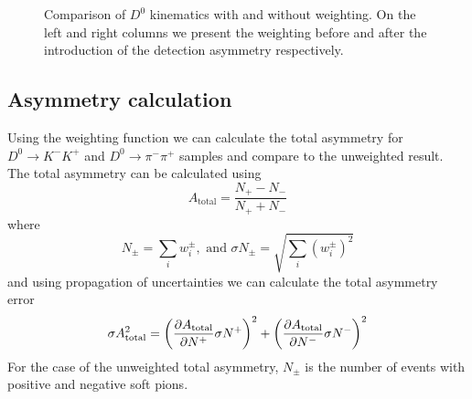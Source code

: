 \documentclass{article}
\begin{document}
\begin{figure}[h!]
                \hfill


                \caption{Comparison of $D^0$ kinematics with and without weighting. On the left and right columns we present the weighting before and after the introduction of the detection asymmetry respectively.}
        \end{figure}

        \subsection{Asymmetry calculation}
        Using the weighting function we can calculate the total asymmetry for $D^0\to K^-K^+$ and $D^0\to\pi^-\pi^+$ samples and compare to the unweighted result.
        The total asymmetry can be calculated using
        \begin{equation}
                A_\text{total} = \frac{N_+ - N_-}{N_+ + N_-}
        \end{equation}
        where 
        \begin{equation}
                N_\pm = \sum_i w_i^\pm, \text{ and } \sigma N_\pm = \sqrt{\sum_i (w_i^\pm)^2}
        \end{equation} 
        and using propagation of uncertainties we can calculate the total asymmetry error
        \begin{equation}
                \sigma A_{\text{total}} ^2 = \left(\pdv{A_{\text{total}}}{N^+}\sigma N^+\right)^2 + \left(\pdv{A_{\text{total}}}{N^-}\sigma N^-\right)^2
        \end{equation}
        For the case of the unweighted total asymmetry, $N_\pm$ is the number of events with positive and negative soft pions.
\end{document}

